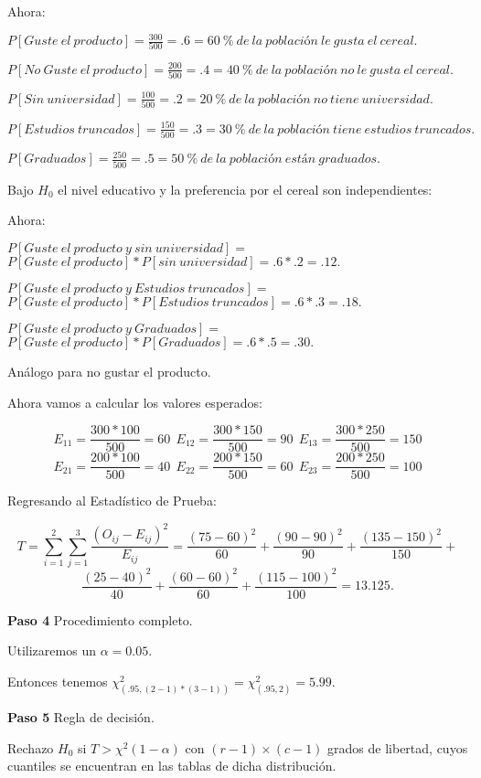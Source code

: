 \documentclass[
  a4paper,
  oneside,
  openany]{book}
\begin{document}
Ahora:

\(P[Guste\ el\ producto]= \frac{300}{500}=.6= 60\ \%\ de\ la\ población\ le\ gusta\ el\ cereal.\)

\(P[No\ Guste\ el\ producto]= \frac{200}{500}=.4= 40\ \%\ de\ la\ población\ no\ le\ gusta\ el\ cereal.\)

\(P[Sin\ universidad]= \frac{100}{500}=.2= 20\ \%\ de\ la\ población\ no\ tiene\ universidad.\)

\(P[Estudios\ truncados]= \frac{150}{500}=.3= 30\ \%\ de\ la\ población\ tiene\ estudios\ truncados.\)

\(P[Graduados]= \frac{250}{500}=.5= 50\ \%\ de\ la\ población\ están\ graduados.\)

Bajo \(H_0\) el nivel educativo y la preferencia por el cereal son independientes:

Ahora:

\(P[Guste\ el\ producto\ y\ sin\ universidad]=\)
\(P[Guste\ el\ producto]*P[sin\ universidad]=.6*.2=.12.\)

\(P[Guste\ el\ producto\ y\ Estudios\ truncados]=\)
\(P[Guste\ el\ producto]*P[Estudios\ truncados]=.6*.3=.18.\)

\(P[Guste\ el\ producto\ y\ Graduados]=\)
\(P[Guste\ el\ producto]*P[Graduados]=.6*.5=.30.\)

Análogo para no gustar el producto.

Ahora vamos a calcular los valores esperados:

\[E_{11}=\frac{300*100}{500}=60 \ \ E_{12}=\frac{300*150}{500}=90 \ \  E_{13}=\frac{300*250}{500}=150\]
\[E_{21}=\frac{200*100}{500}=40 \ \  E_{22}=\frac{200*150}{500}=60 \ \ E_{23}=\frac{200*250}{500}=100\]

Regresando al Estadístico de Prueba:

\[T=\sum_{i=1}^{2}\sum_{j=1}^{3}\frac{(O_{ij}-E_{ij})^2}{E_{ij}}= \frac{(75-60)^2}{60}+\frac{(90-90)^2}{90}+\frac{(135-150)^2}{150}+\]
\[\frac{(25-40)^2}{40}+\frac{(60-60)^2}{60}+\frac{(115-100)^2}{100}=13.125.\]

\textbf{Paso 4} Procedimiento completo.

Utilizaremos un \(\alpha=0.05.\)

Entonces tenemos \(\chi^2_{(.95,(2-1)*(3-1))}=\chi^2_{(.95,2)}=5.99.\)

\textbf{Paso 5} Regla de decisión.

Rechazo \(H_0\) si \(T> \chi^2(1-\alpha)\) con \((r-1)\times(c-1)\) grados de libertad, cuyos cuantiles se encuentran en las tablas de dicha distribución.
\end{document}
